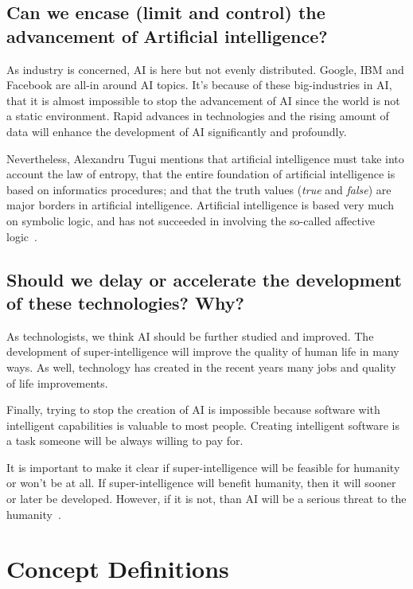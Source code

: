 \documentclass[titlepage, letterpaper, fleqn]{article}
\begin{document}
\subsection{Can we encase (limit and control) the advancement of Artificial intelligence?}

As industry is concerned, AI is here but not evenly distributed.
Google, IBM and Facebook are all-in around AI topics.
It's because of these big-industries in AI, that it is almost impossible to stop the advancement of AI since the world is not a static environment.
Rapid advances in technologies and the rising amount of data will enhance the development of AI significantly and profoundly.

Nevertheless, Alexandru Tugui mentions that artificial intelligence must take into account the law of entropy,
that the entire foundation of artificial intelligence is based on informatics procedures;
and that the truth values (\textit{true} and \textit{false}) are major borders in artificial intelligence.
Artificial intelligence is based very much on symbolic logic, and has not succeeded in involving the so-called affective logic~\cite{Tugui04}.

\subsection{Should we delay or accelerate the development of these technologies? Why?}

As technologists, we think AI should be further studied and improved. The development of super-intelligence will improve the quality of human life in many ways.
As well, technology has created in the recent years many jobs and quality of life improvements.

Finally, trying to stop the creation of AI is impossible because software with intelligent capabilities is valuable to most people.
Creating intelligent software is a task someone will be always willing to pay for.

It is important to make it clear if super-intelligence will be feasible for humanity or won't be at all.
If super-intelligence will benefit humanity, then it will sooner or later be developed. However, if it is not, than AI will be a serious threat to the humanity~\cite{Urban15,Urban15B}.

\section{Concept Definitions}
\end{document}
